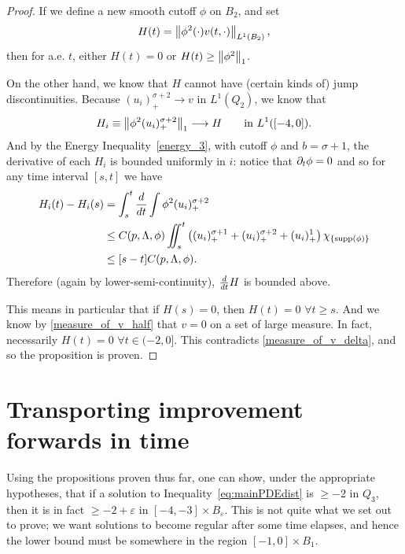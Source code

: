 \begin{proof}
If we define a new smooth cutoff $\phi$ on $B_2$, and set
\[ H(t) = \left\lVert\phi^2(\cdot)v(t,\cdot)\right\rVert_{L^1(B_2)},\]
then for a.e. $t$, either $H(t) = 0$ or $H(t) \geq \left\lVert\phi^2\right\rVert_1$.  

On the other hand, we know that $H$ cannot have (certain kinds of) jump discontinuities.  Because $(u_i)_+^{\sigma+2} \to v$ in $L^1(Q_2)$, we know that 
\[ H_i \equiv \left\lVert\phi^2 (u_i)_+^{\sigma+2}\right\rVert_1 \longrightarrow H \qquad \textrm{in } L^1([-4,0]).\]  
And by the Energy Inequality~\eqref{energy_3}, with cutoff $\phi$ and $b = \sigma+1$, the derivative of each $H_i$ is bounded uniformly in $i$: notice that $\partial_t \phi = 0$ and so for any time interval $[s,t]$ we have
\begin{align*}
H_i(t) - H_i(s) &= \int_s^t \frac{d}{dt} \int \phi^2 (u_i)_+^{\sigma+2}
\\ &\leq C(p,\Lambda,\phi) \iint_s^t \left( (u_i)_+^{\sigma+1} + (u_i)_+^{\sigma+2} + (u_i)_+^1 \right) \chi_{\{\operatorname{supp}(\phi)\}}
\\ &\leq [s-t] C(p,\Lambda,\phi).
\end{align*}
Therefore (again by lower-semi-continuity), $\frac{d}{dt} H$ is bounded above.  

This means in particular that if $H(s) = 0$, then $H(t) = 0$ $\forall t \geq s$.  And we know by \eqref{measure_of_v_half} that $v = 0$ on a set of large measure.  In fact, necessarily $H(t) = 0$ $\forall t \in (-2,0]$.  This contradicts \eqref{measure_of_v_delta}, and so the proposition is proven.  

\end{proof}




\section{Transporting improvement forwards in time}\label{sec:flowforward}




Using the propositions proven thus far, one can show, under the appropriate hypotheses, that if a solution to Inequality~\eqref{eq:mainPDEdist} is $\geq -2$ in $Q_3$, then it is in fact $\geq -2 + \varepsilon$ in $[-4,-3]\times B_\varepsilon$.  This is not quite what we set out to prove; we want solutions to become regular after some time elapses, and hence the lower bound must be somewhere in the region $[-1,0]\times B_1$.  

